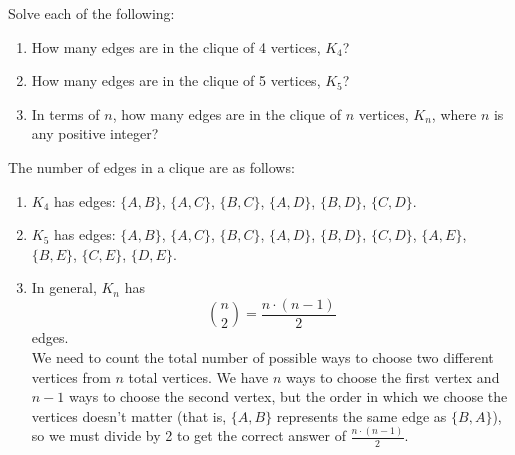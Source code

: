 \documentclass[11pt]{article}
\begin{document}
\begin{problem}
Solve each of the following:
\begin{enumerate}[label=(\alph*)]
\item How many edges are in the clique of 4 vertices, $K_4$?
\item How many edges are in the clique of 5 vertices, $K_5$?
\item In terms of $n$, how many edges are in the clique of $n$ vertices, $K_n$, where $n$ is any positive integer?
\end{enumerate}
\end{problem}

\begin{solution} 
The number of edges in a clique are as follows:
\begin{enumerate}[label=(\alph*)]
\item $K_4$ has  edges: $\{A, B\}$, $\{A, C\}$, $\{B, C\}$, $\{A, D\}$, $\{B, D\}$, $\{C, D\}$.
\item $K_5$ has  edges: $\{A, B\}$, $\{A, C\}$, $\{B, C\}$, $\{A, D\}$, $\{B, D\}$, $\{C, D\}$, $\{A, E\}$, $\{B, E\}$, $\{C, E\}$, $\{D,E\}$.
\item In general, $K_n$ has
\[\binom{n}{2} = \boxed{\frac{n \cdot (n - 1)}{2}}\]
edges. \\
We need to count the total number of possible ways to choose two different vertices from $n$ total vertices. We have $n$ ways to choose the first vertex
and $n - 1$ ways to choose the second vertex, but the order in which we choose the vertices doesn't matter (that is, $\{A,B\}$ represents the same edge
as $\{B, A\}$), so we must divide by 2 to get the correct answer of $\frac{n \cdot (n - 1)}{2}$.
\end{enumerate}
\end{solution}
\end{document}
